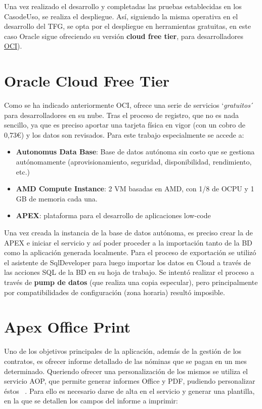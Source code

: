 Una vez realizado el desarrollo y completadas las pruebas establecidas en los \gls{CasodeUso}, se realiza el despliegue. Así, siguiendo la misma operativa en el desarrollo del \acrshort{TFG}, se opta por el despliegue en herramientas gratuitas, en este caso Oracle sigue ofreciendo su versión \textbf{cloud free tier}, para desarrolladores \href{https://www.oracle.com/es/cloud/free/}{\acrfull{OCI}}).

\section{Oracle Cloud Free Tier}\label{sec: OFT}
Como se ha indicado anteriormente \acrshort{OCI}, ofrece una serie de servicios `\textit{gratuitos}´ para desarrolladores en su nube. Tras el proceso de registro, que no es nada sencillo, ya que es preciso aportar una tarjeta física en vigor (con un cobro de 0,73€) y los datos son revisados. Para este trabajo especialmente se accede a:
\begin{itemize}
	\item \textbf{Autonomus Data Base}: Base de datos autónoma sin costo que se gestiona autónomamente (aprovisionamiento, seguridad, disponibilidad, rendimiento, etc.)
	\item \textbf{AMD Compute Instance}: 2 \acrshort{VM} basadas en AMD, con 1/8 de OCPU y 1 GB de memoria cada una.
	\item \textbf{\acrshort{APEX}}: plataforma para el desarrollo de aplicaciones low-code 
\end{itemize}
\label{img: OCloud}
Una vez creada la instancia de la base de datos autónoma, es preciso crear la de \acrshort{APEX} e iniciar el servicio y así poder proceder a la importación tanto de la BD como la aplicación generada localmente.
Para el proceso de exportación se utilizó el asistente de SqlDeveloper para luego importar los datos en Cloud a través de las acciones \acrshort{SQL}  de la BD en su hoja de trabajo. Se intentó realizar el proceso a través de \textbf{pump de datos} (que realiza una copia especular), pero principalmente por compatibilidades de configuración (zona horaria) resultó imposible.

\section{Apex Office Print}
Uno de los objetivos principales de la aplicación, además de la gestión de los contratos, es ofrecer informe detallado de las nóminas que se pagan en un mes determinado. Queriendo ofrecer una personalización de los mismos se utiliza el servicio \acrshort{AOP}, que permite generar informes Office y PDF, pudiendo personalizar éstos ~\cite{OverviewAPEXOffice}.
Para ello es necesario darse de alta en el servicio y generar una plantilla, en la que se detallen los campos del informe a imprimir:
\\
 \label{img:plantilla}

